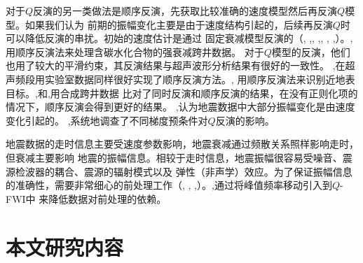 对于$Q$反演的另一类做法是顺序反演，先获取比较准确的速度模型然后再反演$Q$模型。如果我们认为
前期的振幅变化主要是由于速度结构引起的，后续再反演$Q$时可以降低反演的串扰。初始的速度估计是通过
固定衰减模型反演的（, ,, ,, ,
,）。,用顺序反演法来处理含碳水化合物的强衰减跨井数据。
对于$Q$模型的反演，他们也用了较大的平滑约束，其反演结果与超声波形分析结果有很好的一致性。
,在超声频段用实验室数据同样很好实现了顺序反演方法。,
用顺序反演法来识别近地表目标。,和,用合成跨井数据
比对了同时反演和顺序反演的结果，在没有正则化项的情况下，顺序反演会得到更好的结果。
,认为地震数据中大部分振幅变化是由速度变化引起的。
,系统地调查了不同梯度预条件对$Q$反演的影响。

地震数据的走时信息主要受速度参数影响，地震衰减通过频散关系照样影响走时，但衰减主要影响
地震的振幅信息。相较于走时信息，地震振幅很容易受噪音、震源检波器的耦合、震源的辐射模式以及
弹性（非声学）效应。为了保证振幅信息的准确性，需要非常细心的前处理工作（, ,
,）。,通过将峰值频率移动引入到$Q$-FWI中
来降低数据对前处理的依赖。
\vspace{0.5cm}
\section{本文研究内容}


















